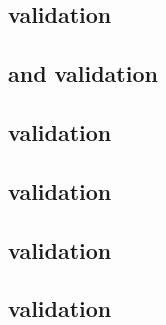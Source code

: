\begin{sbmlenum}
\end{sbmlenum} \subsection*{ validation} \begin{sbmlenum}


\end{sbmlenum} \subsection*{ and  validation} \begin{sbmlenum}


\end{sbmlenum} \subsection*{ validation} \begin{sbmlenum}


\end{sbmlenum} \subsection*{ validation} \begin{sbmlenum}


\end{sbmlenum} \subsection*{ validation} \begin{sbmlenum}


\end{sbmlenum} \subsection*{ validation} \begin{sbmlenum}


\end{sbmlenum}
